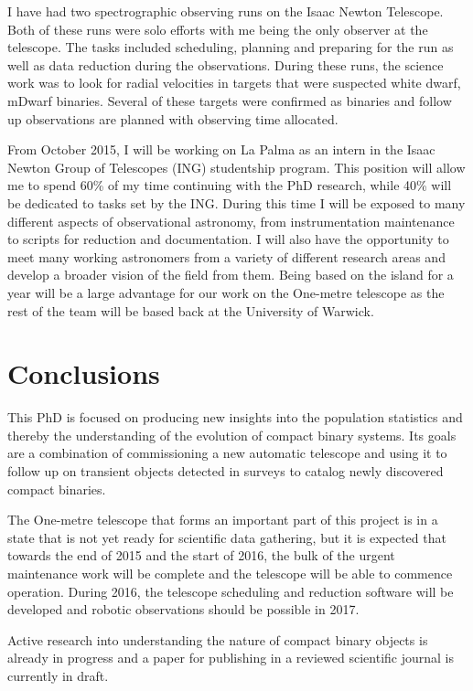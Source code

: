 \documentclass[a4paper,fleqn,usenatbib]{mnras}
\begin{document}
I have had two spectrographic observing runs on the Isaac Newton Telescope. Both of these runs were solo efforts with me being the only observer at the telescope. The tasks included scheduling, planning and preparing for the run as well as data reduction during the observations. During these runs, the science work was to look for radial velocities in targets that were suspected white dwarf, mDwarf binaries. Several of these targets were confirmed as binaries and follow up observations are planned with observing time allocated.  

From October 2015, I will be working on La Palma as an intern in the Isaac Newton Group of Telescopes (ING) studentship program. This position will allow me to spend 60\% of my time continuing with the PhD research, while 40\% will be dedicated to tasks set by the ING. During this time I will be exposed to many different aspects of observational astronomy, from instrumentation maintenance to scripts for reduction and documentation. I will also have the opportunity to meet many working astronomers from a variety of different research areas and develop a broader vision of the field from them.  Being based on the island for a year will be a large advantage for our work on the One-metre telescope as the rest of the team will be based back at the University of Warwick.  

\section{Conclusions}
This PhD is focused on producing new insights into the population statistics and thereby the understanding of the evolution of compact binary systems. Its goals are a combination of commissioning a new automatic telescope and using it to follow up on transient objects detected in surveys to catalog newly discovered compact binaries. 

The One-metre telescope that forms an important part of this project is in a state that is not yet ready for scientific data gathering, but it is expected that towards the end of 2015 and the start of 2016, the bulk of the urgent maintenance work will be complete and the telescope will be able to commence operation. During 2016, the telescope scheduling and reduction software will be developed and robotic observations should be possible in 2017.

Active research into understanding the nature of compact binary objects is already in progress and a paper for publishing in a reviewed scientific journal is currently in draft.
\end{document}
